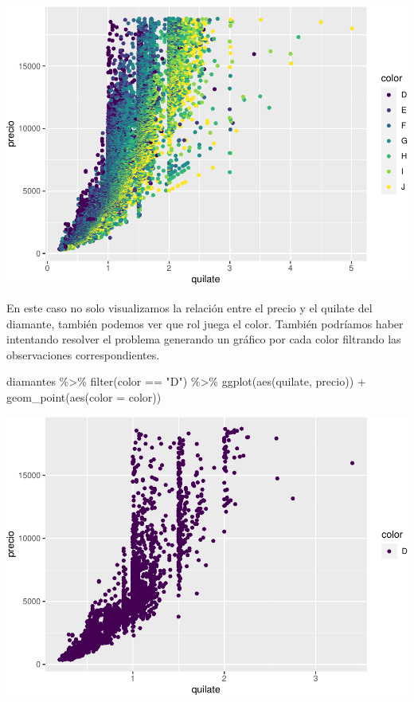 \documentclass[
  openany]{book}
\newenvironment{Shaded}{\begin{snugshade}}{\end{snugshade}}
\newcommand{\AttributeTok}[1]{\textcolor[rgb]{0.77,0.63,0.00}{#1}}
\newcommand{\FunctionTok}[1]{\textcolor[rgb]{0.00,0.00,0.00}{#1}}
\newcommand{\NormalTok}[1]{#1}
\newcommand{\SpecialCharTok}[1]{\textcolor[rgb]{0.00,0.00,0.00}{#1}}
\newcommand{\StringTok}[1]{\textcolor[rgb]{0.31,0.60,0.02}{#1}}
\begin{document}
\begin{center}\includegraphics[width=1\linewidth]{DT6_files/figure-latex/unnamed-chunk-71-1} \end{center}

En este caso no solo visualizamos la relación entre el precio y el quilate del diamante, también podemos ver que rol juega el color.
También podríamos haber intentando resolver el problema generando un gráfico por cada color filtrando las observaciones correspondientes.

\begin{Shaded}
\begin{Highlighting}[]
\NormalTok{diamantes }\SpecialCharTok{\%\textgreater{}\%} 
  \FunctionTok{filter}\NormalTok{(color }\SpecialCharTok{==} \StringTok{"D"}\NormalTok{) }\SpecialCharTok{\%\textgreater{}\%} 
  \FunctionTok{ggplot}\NormalTok{(}\FunctionTok{aes}\NormalTok{(quilate, precio)) }\SpecialCharTok{+}
  \FunctionTok{geom\_point}\NormalTok{(}\FunctionTok{aes}\NormalTok{(}\AttributeTok{color =}\NormalTok{ color))}
\end{Highlighting}
\end{Shaded}

\begin{center}\includegraphics[width=1\linewidth]{DT6_files/figure-latex/unnamed-chunk-72-1} \end{center}
\end{document}
